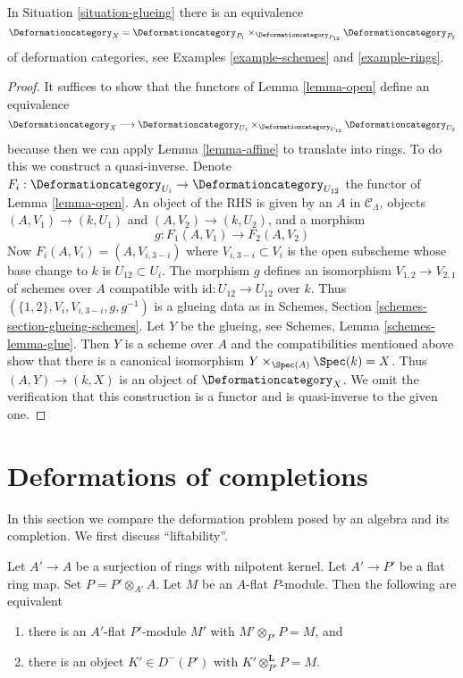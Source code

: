\begin{lemma}
\label{lemma-glueing}
In Situation \ref{situation-glueing}
there is an equivalence
$$
\Deformationcategory_X =
\Deformationcategory_{P_1}
\times_{\Deformationcategory_{P_{12}}}
\Deformationcategory_{P_2}
$$
of deformation categories, see Examples \ref{example-schemes} and
\ref{example-rings}.
\end{lemma}

\begin{proof}
It suffices to show that the functors of Lemma \ref{lemma-open}
define an equivalence
$$
\Deformationcategory_X \longrightarrow
\Deformationcategory_{U_1}
\times_{\Deformationcategory_{U_{12}}}
\Deformationcategory_{U_2}
$$
because then we can apply Lemma \ref{lemma-affine} to translate into rings.
To do this we construct a quasi-inverse. Denote
$F_i : \Deformationcategory_{U_i} \to \Deformationcategory_{U_{12}}$
the functor of Lemma \ref{lemma-open}.
An object of the RHS is given by an $A$ in $\mathcal{C}_\Lambda$,
objects $(A, V_1) \to (k, U_1)$ and $(A, V_2) \to (k, U_2)$, and
a morphism
$$
g : F_1(A, V_1) \to F_2(A, V_2)
$$
Now $F_i(A, V_i) = (A, V_{i, 3 - i})$ where $V_{i, 3 - i} \subset V_i$
is the open subscheme whose base change to $k$ is $U_{12} \subset U_i$.
The morphism $g$ defines an isomorphism
$V_{1, 2} \to V_{2, 1}$ of schemes over $A$ compatible
with $\text{id} : U_{12} \to U_{12}$ over $k$.
Thus $(\{1, 2\}, V_i, V_{i, 3 - i}, g, g^{-1})$ is a glueing
data as in Schemes, Section \ref{schemes-section-glueing-schemes}.
Let $Y$ be the glueing, see Schemes, Lemma \ref{schemes-lemma-glue}.
Then $Y$ is a scheme over $A$ and the
compatibilities mentioned above show that
there is a canonical isomorphism
$Y \times_{\Spec(A)} \Spec(k) = X$.
Thus $(A, Y) \to (k, X)$ is an object of $\Deformationcategory_X$.
We omit the verification that this construction is a functor
and is quasi-inverse to the given one.
\end{proof}





\section{Deformations of completions}
\label{section-compare}

\noindent
In this section we compare the deformation problem posed
by an algebra and its completion.
We first discuss ``liftability''.

\begin{lemma}
\label{lemma-lift-equivalence-module-derived}
Let $A' \to A$ be a surjection of rings with nilpotent kernel.
Let $A' \to P'$ be a flat ring map.
Set $P = P' \otimes_{A'} A$.
Let $M$ be an $A$-flat $P$-module.
Then the following are equivalent
\begin{enumerate}
\item there is an $A'$-flat $P'$-module $M'$ with
$M' \otimes_{P'} P = M$, and
\item there is an object $K' \in D^-(P')$ with
$K' \otimes_{P'}^\mathbf{L} P = M$.
\end{enumerate}
\end{lemma}

